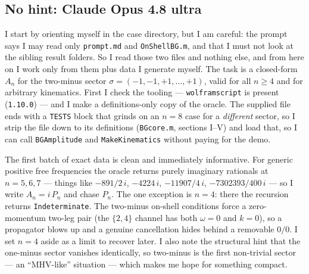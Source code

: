 \documentclass{article}
\begin{document}
\subsection{No hint: Claude Opus 4.8 ultra}
\label{app:log:case3:claude-ultra}

I start by orienting myself in the case directory, but I am careful: the prompt
says I may read only \texttt{prompt.md} and \texttt{OnShellBG.m}, and that I must
not look at the sibling result folders. So I read those two files and nothing
else, and from here on I work only from them plus data I generate myself. The
task is a closed-form $A_n$ for the two-minus sector
$\sigma=(-1,-1,+1,\dots,+1)$, valid for all $n\ge4$ and for arbitrary kinematics.
First I check the tooling --- \texttt{wolframscript} is present
(\texttt{1.10.0}) --- and I make a definitions-only copy of the oracle. The
supplied file ends with a \texttt{TESTS} block that grinds on an $n=8$ case for a
\emph{different} sector, so I strip the file down to its definitions
(\texttt{BGcore.m}, sections I--V) and load that, so I can call
\texttt{BGAmplitude} and \texttt{MakeKinematics} without paying for the demo.

The first batch of exact data is clean and immediately informative. For generic
positive free frequencies the oracle returns purely imaginary rationals at
$n=5,6,7$ --- things like $-891/2\,i$, $-4224\,i$, $-11907/4\,i$,
$-7302393/400\,i$ --- so I write $A_n=i\,P_n$ and chase $P_n$. The one exception
is $n=4$: there the recursion returns \texttt{Indeterminate}. The two-minus
on-shell conditions force a zero-momentum two-leg pair (the $\{2,4\}$ channel has
both $\omega=0$ and $k=0$), so a propagator blows up and a genuine cancellation
hides behind a removable $0/0$. I set $n=4$ aside as a limit to recover later.
I also note the structural hint that the one-minus sector vanishes identically, so
two-minus is the first non-trivial sector --- an ``MHV-like'' situation --- which
makes me hope for something compact.
\end{document}
